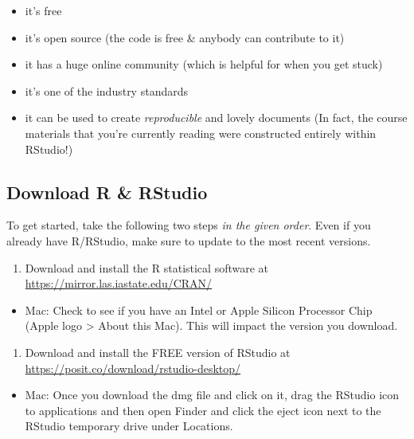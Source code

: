 \documentclass[
  letterpaper,
  DIV=11,
  numbers=noendperiod]{scrreprt}
\providecommand{\tightlist}{%
  \setlength{\itemsep}{0pt}\setlength{\parskip}{0pt}}\usepackage{longtable,booktabs,array}
\begin{document}
\begin{itemize}
\tightlist
\item
  it's free\\
\item
  it's open source (the code is free \& anybody can contribute to it)
\item
  it has a huge online community (which is helpful for when you get
  stuck)\\
\item
  it's one of the industry standards\\
\item
  it can be used to create \emph{reproducible} and lovely documents (In
  fact, the course materials that you're currently reading were
  constructed entirely within RStudio!)
\end{itemize}

\subsection{Download R \& RStudio}\label{download-r-rstudio}

To get started, take the following two steps \emph{in the given order}.
Even if you already have R/RStudio, make sure to update to the most
recent versions.

\begin{enumerate}
\def\labelenumi{\arabic{enumi}.}
\tightlist
\item
  Download and install the R statistical software at
  \url{https://mirror.las.iastate.edu/CRAN/}\\
\end{enumerate}

\begin{itemize}
\tightlist
\item
  Mac: Check to see if you have an Intel or Apple Silicon Processor Chip
  (Apple logo \textgreater{} About this Mac). This will impact the
  version you download.
\end{itemize}

\begin{enumerate}
\def\labelenumi{\arabic{enumi}.}
\setcounter{enumi}{1}
\tightlist
\item
  Download and install the FREE version of RStudio at
  \url{https://posit.co/download/rstudio-desktop/}
\end{enumerate}

\begin{itemize}
\tightlist
\item
  Mac: Once you download the dmg file and click on it, drag the RStudio
  icon to applications and then open Finder and click the eject icon
  next to the RStudio temporary drive under Locations.
\end{itemize}
\end{document}
